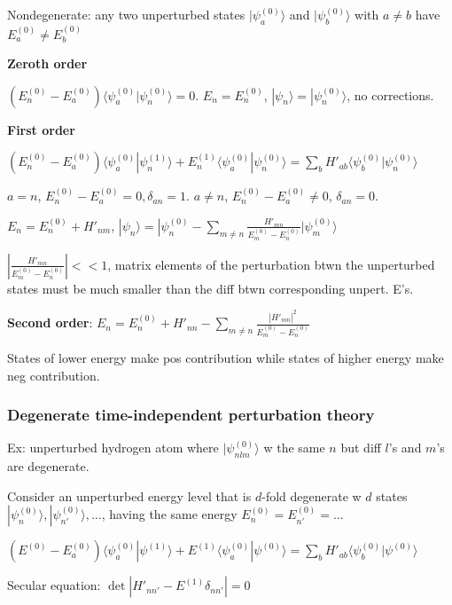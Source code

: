 Nondegenerate: any two unperturbed states $|\psi_a^{(0)}\rangle$ and $|\psi_b^{(0)} \rangle$ with $a \neq b$ have $E_a^{(0)} \neq E_b^{(0)}$

\textbf{Zeroth order}

$(E_n^{(0)} - E_a^{(0)}) \langle \psi_a^{(0)} | \psi_n^{(0)} \rangle = 0$.
$E_n = E_n^{(0)}$, $|\psi_n \rangle = |\psi_n^{(0)} \rangle$, no corrections.

\textbf{First order}

$(E_n^{(0)} - E_a^{(0)}) \langle \psi_a^{(0)} | \psi_n^{(1)} \rangle + E_n^{(1)} \langle \psi_a^{(0)} | \psi_n^{(0)} \rangle = \sum_b H'_{ab} \langle \psi_b^{(0)} | \psi_n^{(0)} \rangle$

$a = n$, $E_n^{(0)} - E_a^{(0)} = 0, \delta_{an} = 1$.
$a \neq n$, $E_n^{(0)} - E_a^{(0)} \neq 0$, $\delta_{an} = 0$.

$E_n = E_n^{(0)} + H'_{nm}$, $|\psi_n \rangle = | \psi_n^{(0)} - \sum_{m \neq n} \frac{H'_{mn}}{E^{(0)}_m - E^{(0)}_n} | \psi_m^{(0)} \rangle$

$|\frac{H'_{mn}}{E_m^{(0)} - E_n^{(0)}}| << 1$, matrix elements of the perturbation btwn the unperturbed states must be much smaller than the diff btwn corresponding unpert. E's. 

\textbf{Second order}:
$E_n = E_n^{(0)} + H'_{nn} - \sum_{m \neq n} \frac{|H'_{mn}|^2}{E_m^{(0)} - E_n^{(0)}}$

States of lower energy make pos contribution while states of higher energy make neg contribution.

\subsubsection{Degenerate time-independent perturbation theory}

Ex: unperturbed hydrogen atom where $|\psi^{(0)}_{nlm}\rangle$ w the same $n$ but diff $l$'s and $m$'s are degenerate.

Consider an unperturbed energy level that is $d$-fold degenerate w $d$ states $|\psi_n^{(0)}\rangle, |\psi_{n'}^{(0)}\rangle, \dots$, having the same energy $E_n^{(0)} = E_{n'}^{(0)} = \dots$


$(E^{(0)} - E^{(0)}_a) \langle \psi^{(0)}_a | \psi^{(1)} \rangle + E^{(1)} \langle \psi_a^{(0)} | \psi^{(0)} \rangle = \sum_b H'_{ab} \langle \psi_b^{(0)} | \psi^{(0)} \rangle$

Secular equation: $\det |H'_{nn'} - E^{(1)} \delta_{n n'}| = 0$

